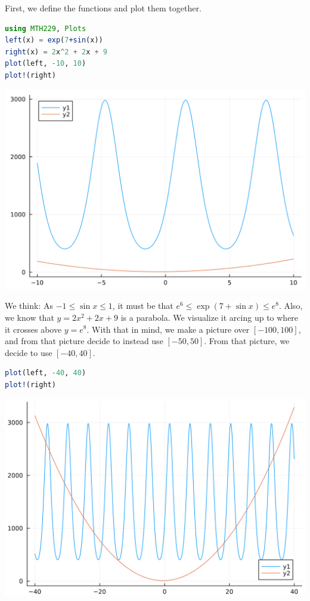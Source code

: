 \documentclass[12pt,answers]{book}
\begin{document}
\vspace{5mm}
First, we define the functions and plot them together.\newline
\begin{minipage}{0.49\textwidth}
\begin{lstlisting}[language=Julia]
using MTH229, Plots
left(x) = exp(7+sin(x))
right(x) = 2x^2 + 2x + 9
plot(left, -10, 10)
plot!(right)
\end{lstlisting}
\end{minipage}
\begin{minipage}{0.49\textwidth}
  \includegraphics[width=0.7\linewidth]{SkeletonNotes/04-graphics-1}
\end{minipage}\newline
We think: As $-1\le \sin x \le 1$, it must be that $e^6 \le \exp(7+\sin x) \le e^8$. Also, we know that $y=2x^2+2x+9$ is a parabola. We visualize it arcing up to where it crosses above $y=e^8$. With that in mind, we make a picture over $[-100,100]$, and from that picture decide to instead use $[-50,50]$. From that picture, we decide to use $[-40,40]$.\newline
\begin{minipage}{0.49\textwidth}
\begin{lstlisting}[language=Julia]
plot(left, -40, 40)
plot!(right)
\end{lstlisting}
\end{minipage}
\begin{minipage}{0.49\textwidth}
\includegraphics[width=0.7\linewidth]{SkeletonNotes/04-graphics-2}
\end{minipage}\newline
\end{document}
